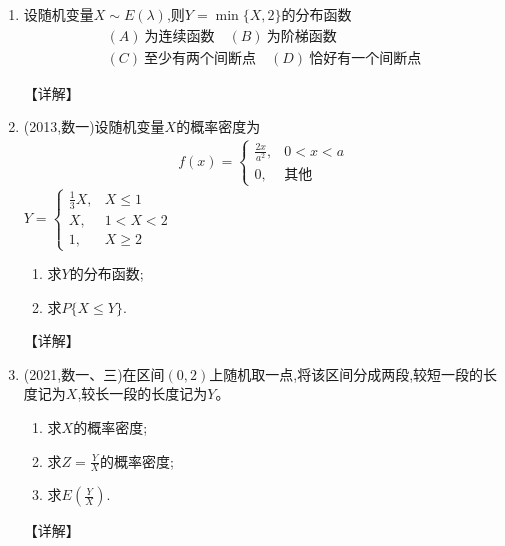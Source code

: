 \documentclass[12pt, a4paper, oneside, UTF8]{ctexbook}
\begin{document}
\begin{enumerate}[label=\arabic*.,start=15]
    \item  设随机变量$X\sim E(\lambda)$,则$Y=\min\{X,2\}$的分布函数
    \begin{align*}
        (A)\ 为连续函数 \quad (B)\ 为阶梯函数 \\
        (C)\ 至少有两个间断点 \quad (D)\ 恰好有一个间断点
    \end{align*}
    
    \begin{solution}
    【详解】
    \end{solution}
    
    \item  (2013,数一)设随机变量$X$的概率密度为
    \begin{align*}
        f(x)=\begin{cases}
            \frac{2x}{a^2}, & 0<x<a \\
            0, & \text{其他}
        \end{cases}
    \end{align*}
    $Y=\begin{cases}
        \frac{1}{3}X, & X\leq 1 \\
        X, & 1<X<2 \\
        1, & X\geq 2
    \end{cases}$
    \begin{enumerate}
        \item 求$Y$的分布函数;
        \item 求$P\{X\leq Y\}$.
    \end{enumerate}
    
    \begin{solution}
    【详解】
    \end{solution}
    
    \item  (2021,数一、三)在区间$(0,2)$上随机取一点,将该区间分成两段,较短一段的长度记为$X$,较长一段的长度记为$Y$。
    \begin{enumerate}
        \item 求$X$的概率密度;
        \item 求$Z=\frac{Y}{X}$的概率密度;
        \item 求$E\left(\frac{Y}{X}\right)$.
    \end{enumerate}
    
    \begin{solution}
    【详解】
    \end{solution}
\end{enumerate}
\end{document}

